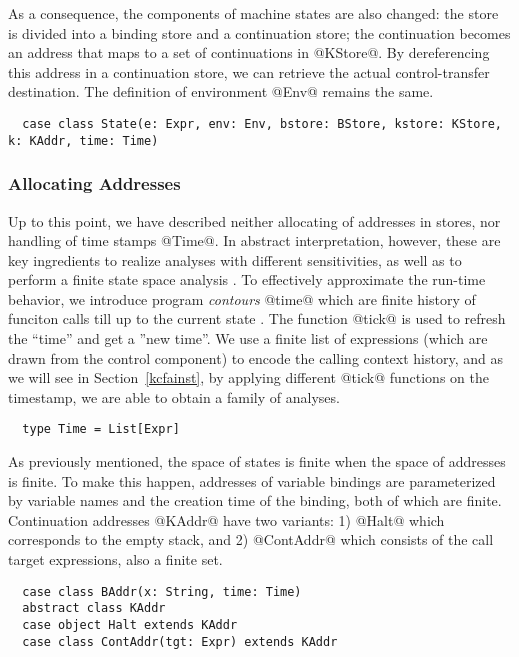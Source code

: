 \documentclass[acmsmall, review]{acmart}\settopmatter{}
\begin{document}
As a consequence, the components of machine states are also changed: the store is divided
into a binding store and a continuation store; the continuation becomes an address
that maps to a set of continuations in @KStore@.
By dereferencing this address in a continuation store, we can retrieve the actual 
control-transfer destination. The definition of environment @Env@ remains the same.

\begin{lstlisting}
  case class State(e: Expr, env: Env, bstore: BStore, kstore: KStore, k: KAddr, time: Time)
\end{lstlisting}

\subsubsection{Allocating Addresses}
Up to this point, we have described neither allocating of addresses in stores, nor handling
of time stamps @Time@. In abstract interpretation, however, these are key ingredients
to realize analyses with different sensitivities, as well as to perform a finite
state space analysis \cite{Gilray:2016:ACP:2951913.2951936}.
To effectively approximate the run-time behavior, we introduce program \emph{contours} @time@ 
which are finite history of funciton calls till up to the current state \cite{Shivers:1991:SSC:115865.115884}.
The function @tick@ is used to refresh the ``time'' and get a ''new time''. 
We use a finite list of expressions (which are drawn from the control component) to encode the 
calling context history, and as we will see in Section~\ref{kcfainst}, by applying different 
@tick@ functions on the timestamp, we are able to obtain a family of analyses.

\begin{lstlisting}
  type Time = List[Expr]
\end{lstlisting}

As previously mentioned, the space of states is finite when the space of addresses is finite.
To make this happen, addresses of variable bindings are parameterized by variable names and the creation
time of the binding, both of which are finite. Continuation addresses @KAddr@ have two variants:
1) @Halt@ which corresponds to the empty stack, and
2) @ContAddr@ which consists of the call target expressions, also a finite set.

\begin{lstlisting}
  case class BAddr(x: String, time: Time) 
  abstract class KAddr
  case object Halt extends KAddr
  case class ContAddr(tgt: Expr) extends KAddr
\end{lstlisting}
\end{document}
